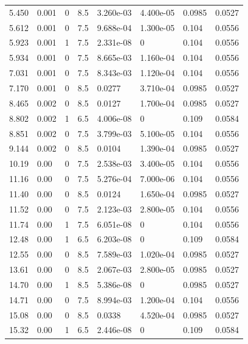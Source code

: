 \documentclass[preview]{standalone}
\begin{document}
{{\begin{tabular}{L{1.2cm}C{1.2cm} C{0.3cm}C{0.5cm} C{1.4cm}C{1.4cm} C{1.4cm}C{1.4cm}}
  5.450  &  0.001  & 0     & 8.5 &  3.260e-03  & 4.400e-05  & 0.0985 &  0.0527   \\ 
  5.612  &  0.001  & 0     & 7.5 &  9.688e-04  & 1.300e-05  & 0.104 &  0.0556   \\ 
  5.923  &  0.001  & 1     & 7.5 &  2.331e-08  & 0  & 0.104 &  0.0556   \\ 
  5.934  &  0.001  & 0     & 7.5 &  8.665e-03  & 1.160e-04  & 0.104 &  0.0556   \\ 
  7.031  &  0.001  & 0     & 7.5 &  8.343e-03  & 1.120e-04  & 0.104 &  0.0556   \\ 
  7.170  &  0.001  & 0     & 8.5 &  0.0277  & 3.710e-04  & 0.0985 &  0.0527   \\ 
  8.465  &  0.002  & 0     & 8.5 &  0.0127  & 1.700e-04  & 0.0985 &  0.0527   \\ 
  8.802  &  0.002  & 1     & 6.5 &  4.006e-08  & 0  & 0.109 &  0.0584   \\ 
  8.851  &  0.002  & 0     & 7.5 &  3.799e-03  & 5.100e-05  & 0.104 &  0.0556   \\ 
  9.144  &  0.002  & 0     & 8.5 &  0.0104  & 1.390e-04  & 0.0985 &  0.0527   \\ 
  10.19  &  0.00  & 0     & 7.5 &  2.538e-03  & 3.400e-05  & 0.104 &  0.0556   \\ 
  11.16  &  0.00  & 0     & 7.5 &  5.276e-04  & 7.000e-06  & 0.104 &  0.0556   \\ 
  11.40  &  0.00  & 0     & 8.5 &  0.0124  & 1.650e-04  & 0.0985 &  0.0527   \\ 
  11.52  &  0.00  & 0     & 7.5 &  2.123e-03  & 2.800e-05  & 0.104 &  0.0556   \\ 
  11.74  &  0.00  & 1     & 7.5 &  6.051e-08  & 0  & 0.104 &  0.0556   \\ 
  12.48  &  0.00  & 1     & 6.5 &  6.203e-08  & 0  & 0.109 &  0.0584   \\ 
  12.55  &  0.00  & 0     & 8.5 &  7.589e-03  & 1.020e-04  & 0.0985 &  0.0527   \\ 
  13.61  &  0.00  & 0     & 8.5 &  2.067e-03  & 2.800e-05  & 0.0985 &  0.0527   \\ 
  14.70  &  0.00  & 1     & 8.5 &  5.386e-08  & 0  & 0.0985 &  0.0527   \\ 
  14.71  &  0.00  & 0     & 7.5 &  8.994e-03  & 1.200e-04  & 0.104 &  0.0556   \\ 
  15.08  &  0.00  & 0     & 8.5 &  0.0338  & 4.520e-04  & 0.0985 &  0.0527   \\ 
  15.32  &  0.00  & 1     & 6.5 &  2.446e-08  & 0  & 0.109 &  0.0584   \\ 

\end{tabular}}}
\end{document}
